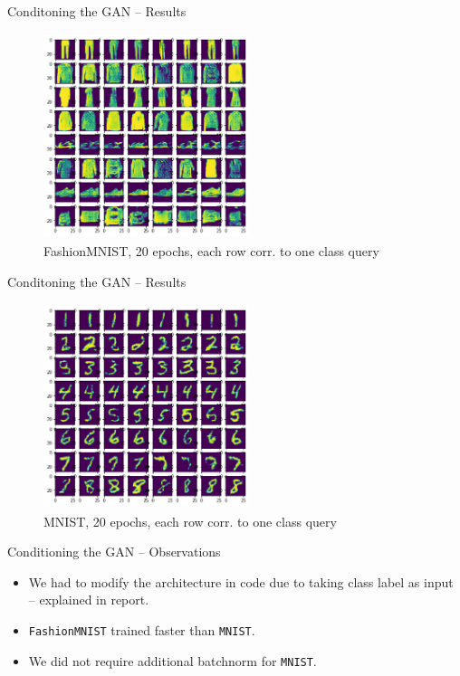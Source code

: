 \documentclass[handout]{beamer}
\begin{document}
\begin{frame}{Conditoning the GAN -- Results}
    \begin{figure}[H]
        \centering
        \includegraphics[height = 6cm, width = 6cm]{condGAN_Fashion_20epoc.png}
        \caption{FashionMNIST, 20 epochs, each row corr. to one class query}
        \label{fig:my_label}
    \end{figure}
\end{frame}
\begin{frame}{Conditoning the GAN -- Results}
      \begin{figure}[H]
        \centering
        \includegraphics[height = 6cm, width = 6cm]{condGAN_MNIST_20epoc.png}
        \caption{MNIST, 20 epochs, each row corr. to one class query}
        \label{fig:my_label}
    \end{figure}
\end{frame}
\begin{frame}{Conditioning the GAN -- Observations}
    \begin{itemize}
        \item We had to modify the architecture in code due to taking class label as input -- explained in report. \pause 
        \item \texttt{FashionMNIST} trained faster than \texttt{MNIST}. \pause
        \item We did not require additional batchnorm for \texttt{MNIST}.
    \end{itemize}
\end{frame}
\end{document}
